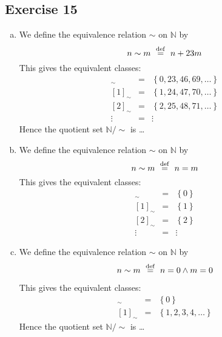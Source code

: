 \documentclass[a4paper]{article}
\newcommand{\exerciseenum}[2]{\subsection*{Exercise #1}{\begin{enumerate}[a)]#2\end{enumerate}}}
\newcommand{\set}[1]{\ensuremath{\left\{{#1}\right\}}}
\newcommand{\NN}{\ensuremath{\mathbb{N}}}
\newcommand{\isdef}{\ensuremath{\,\,\buildrel\rm def\over=}\,\,}
\begin{document}
\exerciseenum{15}{%
\item%
We define the equivalence relation $\sim$ on $\NN$ by
\[
n \sim m  \isdef  n + 23m
\]
This gives the equivalent classes:
\begin{eqnarray*}
[0]_{\sim} &=&  \set{0, 23, 46, 69, \dots} \\
{[1]_{\sim}} &=&  \set{1, 24, 47, 70, \dots} \\
{[2]_{\sim}} &=&  \set{2, 25, 48, 71, \dots} \\
\vdots &=&  \vdots
\end{eqnarray*}
Hence the quotient set $\NN/\sim$ is \dots

\item%
We define the equivalence relation $\sim$ on $\NN$ by
\[
n \sim m  \isdef  n = m
\]
This gives the equivalent classes:
\begin{eqnarray*}
[0]_{\sim} &=&  \set{0} \\
{[1]_{\sim}} &=&  \set{1} \\
{[2]_{\sim}} &=&  \set{2} \\
\vdots &=&  \vdots
\end{eqnarray*}

\addtocounter{enumi}{1}
\item%
We define the equivalence relation $\sim$ on $\NN$ by
\[
n \sim m  \isdef  n = 0 \land m = 0
\]

This gives the equivalent classes:
\begin{eqnarray*}
[0]_{\sim} &=&  \set{0} \\
{[1]_{\sim}} &=&  \set{1, 2, 3, 4, \dots}
\end{eqnarray*}
Hence the quotient set $\NN/\sim$ is \dots
}
\end{document}

